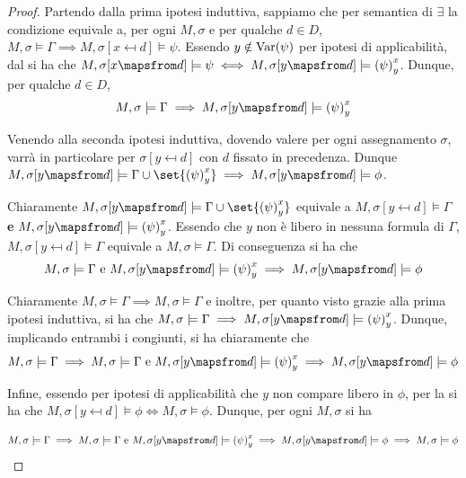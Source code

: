 \begin{proof}
  Partendo dalla prima ipotesi induttiva, sappiamo che per semantica di \(\exists\) la condizione equivale a, per ogni \(M,\sigma\) e per qualche \(d \in D\),
  \(M,\sigma \models \Gamma \implies M,\sigma[x\mapsfrom d]\models \psi\). Essendo \(y\notin \operatorname{Var}(\psi)\) per ipotesi di applicabilità, dal  si ha che \(M,\sigma[x\mapsfrom d]\models \psi \iff M,\sigma[y\mapsfrom d]\models \subs{\psi}{x}{y}\). Dunque, per qualche \(d\in D\),
  \[M,\sigma\models \Gamma \implies M,\sigma[y\mapsfrom d]\models \subs{\psi}{x}{y}\]

  Venendo alla seconda ipotesi induttiva, dovendo valere per ogni assegnamento \(\sigma\), varrà in particolare per \(\sigma[y\mapsfrom d]\) con \(d\) fissato in precedenza. Dunque \(M,\sigma[y\mapsfrom d]\models \Gamma \cup \set{\subs{\psi}{x}{y}} \implies M,\sigma[y\mapsfrom d]\models \phi\).

  Chiaramente \(M,\sigma[y\mapsfrom d]\models \Gamma\cup\set{\subs{\psi}{x}{y}}\) equivale a \(M,\sigma[y\mapsfrom d]\models \Gamma\) \textbf{e} \(M,\sigma[y\mapsfrom d]\models \subs{\psi}{x}{y}\). Essendo che \(y\) non è libero in nessuna formula di \(\Gamma\), \(M,\sigma[y\mapsfrom d]\models \Gamma\) equivale a \(M,\sigma\models \Gamma\).
  Di conseguenza si ha che
  \[M,\sigma\models \Gamma \text{ e } M,\sigma[y\mapsfrom d]\models \subs{\psi}{x}{y} \implies M,\sigma[y\mapsfrom d]\models \phi\]

  Chiaramente \(M,\sigma\models \Gamma \implies M,\sigma\models \Gamma\) e inoltre, per quanto visto grazie alla prima ipotesi induttiva, si ha che \(M,\sigma\models \Gamma \implies M,\sigma[y\mapsfrom d]\models \subs{\psi}{x}{y}\). Dunque, implicando entrambi i congiunti, si ha chiaramente che 
  \[M,\sigma \models \Gamma \implies M,\sigma\models \Gamma \text{ e } M,\sigma[y\mapsfrom d]\models \subs{\psi}{x}{y}\implies M,\sigma[y\mapsfrom d]\models \phi\]

  Infine, essendo per ipotesi di applicabilità che \(y\) non compare libero in \(\phi\), per la  si ha che \(M,\sigma[y\mapsfrom d]\models \phi \iff M,\sigma\models \phi\). Dunque, per ogni \(M,\sigma\) si ha

  \[M,\sigma \models \Gamma \implies M,\sigma\models \Gamma \text{ e } M,\sigma[y\mapsfrom d]\models \subs{\psi}{x}{y}\implies M,\sigma[y\mapsfrom d]\models \phi\implies M,\sigma\models \phi\]

\end{proof}

